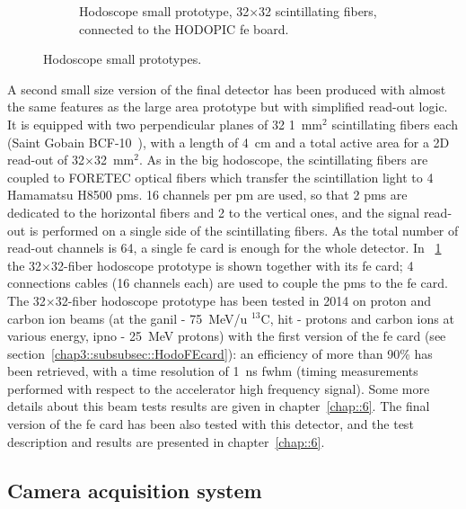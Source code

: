 \begin{figure}
\begin{subfigure}[t]{.5\textwidth}
\caption{Hodoscope small prototype, 32$\times$32 scintillating fibers, connected to the HODOPIC \gls{fe} board.}
\label{chap3::fig::Hodoscope32}
\end{subfigure}
\caption{Hodoscope small prototypes.}
\label{chap3::fig::HodoSmall}
\end{figure}

A second small size version of the final detector has been produced with almost the same features as the large area prototype but with simplified read-out logic. It is equipped with two perpendicular planes of 32 1~mm$^{2}$ scintillating fibers each (Saint Gobain BCF-10~\parencite{SaintGobain2017}), with a length of 4~cm and a total active area for a 2D read-out of 32$\times$32~mm$^{2}$. As in the big hodoscope, the scintillating fibers are coupled to FORETEC optical fibers which transfer the scintillation light to 4 Hamamatsu H8500 \glspl{pm}. 16 channels per \gls{pm} are used, so that 2 \glspl{pm} are dedicated to the horizontal fibers and 2 to the vertical ones, and the signal read-out is performed on a single side of the scintillating fibers. As the total number of read-out channels is 64, a single \gls{fe} card is enough for the whole detector. In \figurename~\ref{chap3::fig::Hodoscope32} the 32$\times$32-fiber hodoscope prototype is shown together with its \gls{fe} card; 4 connections cables (16 channels each) are used to couple the \glspl{pm} to the \gls{fe} card.\\
The 32$\times$32-fiber hodoscope prototype has been tested in 2014 on proton and carbon ion beams (at the \gls{ganil} - 75~MeV/u $^{13}$C, \gls{hit} - protons and carbon ions at various energy, \gls{ipno} - 25~MeV protons) with the first version of the \gls{fe} card (see section~\ref{chap3::subsubsec::HodoFEcard}): an efficiency of more than 90\% has been retrieved, with a time resolution of 1~ns \gls{fwhm} (timing measurements performed with respect to the accelerator high frequency signal). Some more details about this beam tests results are given in chapter~\ref{chap::6}. The final version of the \gls{fe} card has been also tested with this detector, and the test description and results are presented in chapter~\ref{chap::6}.  
   


\subsection{Camera acquisition system}\label{chap3::subsec::cameraElectronicsDAQ}

